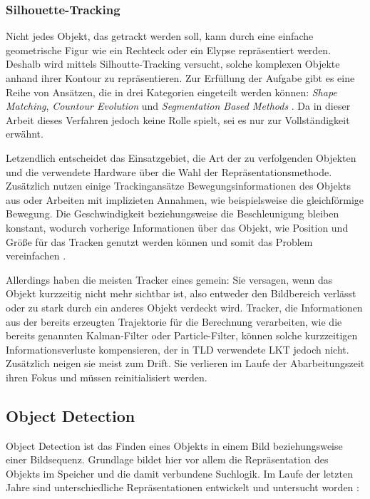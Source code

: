 \subsubsection{Silhouette-Tracking}
Nicht jedes Objekt, das getrackt werden soll, kann durch eine einfache geometrische Figur wie ein Rechteck oder ein Elypse repräsentiert werden. Deshalb wird mittels Silhoutte-Tracking versucht, solche komplexen Objekte anhand ihrer Kontour zu repräsentieren. Zur Erfüllung der Aufgabe gibt es eine Reihe von Ansätzen, die in drei Kategorien eingeteilt werden können: \textit{Shape Matching}\cite{TNO}, \textit{Countour Evolution}\cite{DMS} und \textit{Segmentation Based Methods} \cite{TGC}. Da in dieser Arbeit dieses Verfahren jedoch keine Rolle spielt, sei es nur zur Vollständigkeit erwähnt.

Letzendlich entscheidet das Einsatzgebiet, die Art der zu verfolgenden Objekten und die verwendete Hardware über die Wahl der Repräsentationsmethode. Zusätzlich nutzen einige Trackingansätze Bewegungsinformationen des Objekts aus oder Arbeiten mit implizieten Annahmen, wie beispielsweise die gleichförmige Bewegung. Die Geschwindigkeit beziehungsweise die Beschleunigung bleiben konstant, wodurch vorherige Informationen über das Objekt, wie Position und Größe für das Tracken genutzt werden können und somit das Problem vereinfachen \cite{OTS}.

Allerdings haben die meisten Tracker eines gemein: Sie versagen, wenn das Objekt kurzzeitig nicht mehr sichtbar ist, also entweder den Bildbereich verlässt oder zu stark durch ein anderes Objekt verdeckt wird. Tracker, die Informationen aus der bereits erzeugten Trajektorie für die Berechnung verarbeiten, wie die bereits genannten Kalman-Filter oder Particle-Filter, können solche kurzzeitigen Informationsverluste kompensieren, der in TLD verwendete LKT jedoch nicht. Zusätzlich neigen sie meist zum Drift. Sie verlieren im Laufe der Abarbeitungszeit ihren Fokus und müssen reinitialisiert werden.

\subsection{Object Detection}
Object Detection ist das Finden eines Objekts in einem Bild beziehungsweise einer Bildsequenz. Grundlage bildet hier vor allem die Repräsentation des Objekts im Speicher und die damit verbundene Suchlogik. Im Laufe der letzten Jahre sind unterschiedliche Repräsentationen entwickelt und untersucht worden \cite{OTS}:

